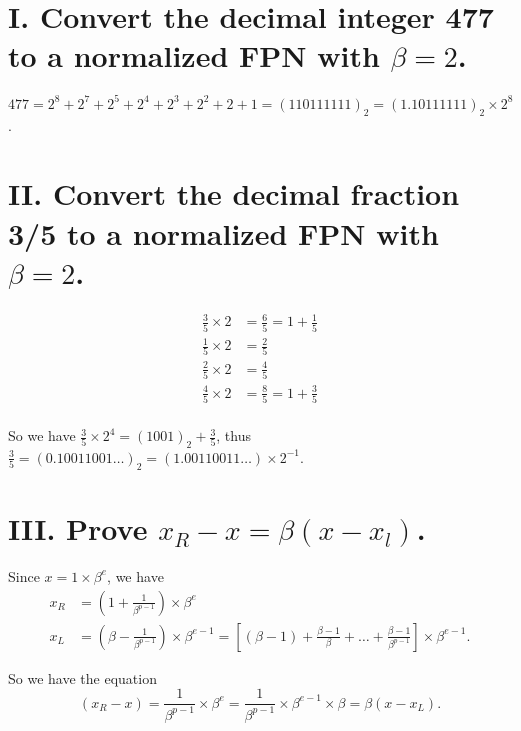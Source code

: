 \documentclass[twoside,a4paper]{article}
\begin{document}
\pagestyle{fancy}
\fancyhead{}


\section*{I. \small{Convert the decimal integer  477 to a normalized FPN with $\beta=2$.}}
$477=2^{8}+2^{7}+2^{5}+2^{4}+2^{3}+2^2+2+1=\left( 110111111 \right)_{2}=\left( 1.10111111 \right)_{2}\times2^{8}  $.

\section*{II. \small{Convert the decimal fraction 3/5 to a normalized FPN with $\beta=2$.}}
\begin{equation*}
	\begin{split}
		\frac{3}{5}\times2&=\frac{6}{5}=1+\frac{1}{5}\\
		\frac{1}{5}\times2&=\frac{2}{5}\\
		\frac{2}{5}\times2&=\frac{4}{5}\\
		\frac{4}{5}\times2&=\frac{8}{5}=1+\frac{3}{5}\\
	\end{split}	
\end{equation*}

So we have $\frac{3}{5}\times 2^{4}=(1001)_{2}+\frac{3}{5}$, thus $\frac{3}{5}=\left( 0.10011001\ldots \right)_{2}
=\left( 1.00110011\ldots \right)\times 2^{-1}  $.

\section*{III. \small{Prove $x_{R}-x=\beta\left( x-x_{l} \right) $.}}
Since $x=1\times \beta^{e}$, we have 
\begin{equation*}
	\begin{split}
		x_R&=\left( 1+\frac{1}{\beta^{p-1}} \right)\times \beta^{e}\\ 
		x_L&=\left( \beta-\frac{1}{\beta^{p-1}} \right)\times \beta^{e-1}
		=[\left( \beta-1 \right)+\frac{\beta-1}{\beta}+\ldots+\frac{\beta-1}{\beta^{p-1}}]\times \beta^{e-1}  .
	\end{split}
\end{equation*}

So we have the equation
\[
	\left( x_R-x \right)=\frac{1}{\beta^{p-1}}\times \beta^{e}=\frac{1}{\beta^{p-1}}\times \beta^{e-1}\times \beta  
	=\beta\left( x-x_L \right) 
.\] 
\end{document}
